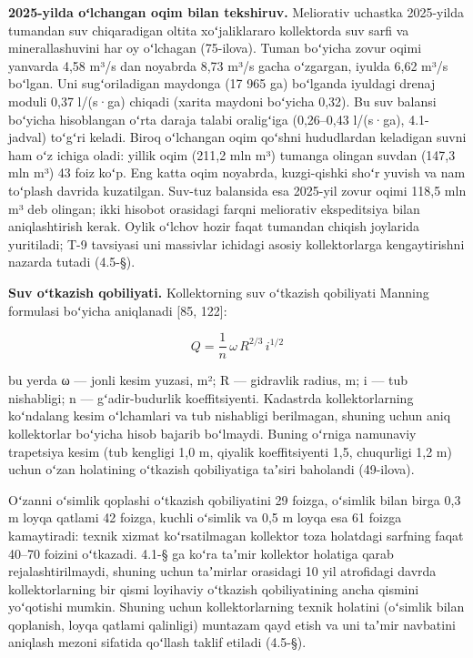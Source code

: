 \textbf{2025-yilda oʻlchangan oqim bilan tekshiruv.} Meliorativ uchastka
2025-yilda tumandan suv chiqaradigan oltita xoʻjaliklararo kollektorda
suv sarfi va minerallashuvini har oy oʻlchagan (75-ilova). Tuman
boʻyicha zovur oqimi yanvarda 4,58 m³/s dan noyabrda 8,73 m³/s gacha
oʻzgargan, iyulda 6,62 m³/s boʻlgan. Uni sugʻoriladigan maydonga (17 965
ga) boʻlganda iyuldagi drenaj moduli 0,37 l/(s·ga) chiqadi (xarita
maydoni boʻyicha 0,32). Bu suv balansi boʻyicha hisoblangan oʻrta daraja
talabi oraligʻiga (0,26--0,43 l/(s·ga), 4.1-jadval) toʻgʻri keladi.
Biroq oʻlchangan oqim qoʻshni hududlardan keladigan suvni ham oʻz ichiga
oladi: yillik oqim (211,2 mln m³) tumanga olingan suvdan (147,3 mln m³)
43 foiz koʻp. Eng katta oqim noyabrda, kuzgi-qishki shoʻr yuvish va nam
toʻplash davrida kuzatilgan. Suv-tuz balansida esa 2025-yil zovur oqimi
118,5 mln m³ deb olingan; ikki hisobot orasidagi farqni meliorativ
ekspeditsiya bilan aniqlashtirish kerak. Oylik oʻlchov hozir faqat
tumandan chiqish joylarida yuritiladi; T-9 tavsiyasi uni massivlar
ichidagi asosiy kollektorlarga kengaytirishni nazarda tutadi (4.5-§).

\textbf{Suv oʻtkazish qobiliyati.} Kollektorning suv oʻtkazish
qobiliyati Manning formulasi boʻyicha aniqlanadi {[}85, 122{]}:

\begin{equation}\tag{4.3}
Q = \frac{1}{n} \, \omega \, R^{2/3} \, i^{1/2}
\end{equation}

bu yerda ω --- jonli kesim yuzasi, m²; R --- gidravlik radius, m; i ---
tub nishabligi; n --- gʻadir-budurlik koeffitsiyenti. Kadastrda
kollektorlarning koʻndalang kesim oʻlchamlari va tub nishabligi
berilmagan, shuning uchun aniq kollektorlar boʻyicha hisob bajarib
boʻlmaydi. Buning oʻrniga namunaviy trapetsiya kesim (tub kengligi 1,0
m, qiyalik koeffitsiyenti 1,5, chuqurligi 1,2 m) uchun oʻzan holatining
oʻtkazish qobiliyatiga taʼsiri baholandi (49-ilova).

Oʻzanni oʻsimlik qoplashi oʻtkazish qobiliyatini 29 foizga, oʻsimlik
bilan birga 0,3 m loyqa qatlami 42 foizga, kuchli oʻsimlik va 0,5 m
loyqa esa 61 foizga kamaytiradi: texnik xizmat koʻrsatilmagan kollektor
toza holatdagi sarfning faqat 40--70 foizini oʻtkazadi. 4.1-§ ga koʻra
taʼmir kollektor holatiga qarab rejalashtirilmaydi, shuning uchun
taʼmirlar orasidagi 10 yil atrofidagi davrda kollektorlarning bir qismi
loyihaviy oʻtkazish qobiliyatining ancha qismini yoʻqotishi mumkin.
Shuning uchun kollektorlarning texnik holatini (oʻsimlik bilan
qoplanish, loyqa qatlami qalinligi) muntazam qayd etish va uni taʼmir
navbatini aniqlash mezoni sifatida qoʻllash taklif etiladi (4.5-§).

